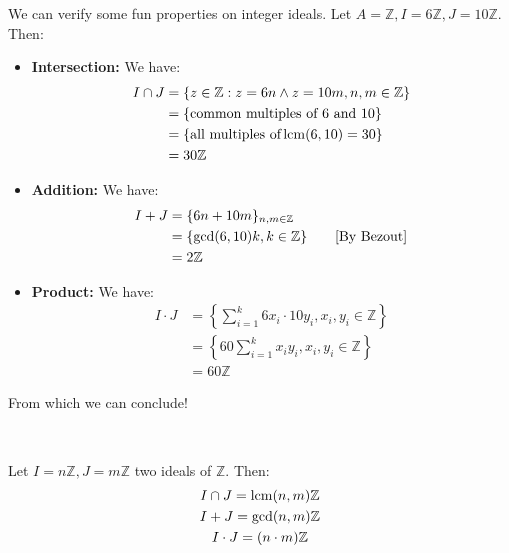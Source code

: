 We can verify some fun properties on integer ideals. Let $A = \mathbb{Z}, I = 6\mathbb{Z}, J = 10\mathbb{Z}$. Then: 
\begin{itemize}
  \item \textbf{Intersection:} We have: 
  \begin{align*}
    I \cap J 
    &= \{z \in \mathbb{Z}: z = 6n \land z = 10m, n, m \in \mathbb{Z}\} \\
    &= \{\text{common multiples of 6 and 10}\} \\
    &= \{\text{all multiples of} \operatorname{lcm}(6, 10) = 30\} \\
    &= 30\mathbb{Z}
  \end{align*}
  \item \textbf{Addition:} We have: 
  \begin{align*}
    I + J 
    &= \{6n + 10m\}_{n, m \in \mathbb{Z}} \\
    &= \{\gcd(6, 10)k, k \in \mathbb{Z}\} \tag*{\text{[By Bezout]}} \\
    &= 2\mathbb{Z}
  \end{align*}
  \item \textbf{Product:} We have: 
  \begin{align*}
    I \cdot J 
    &= \left\{\sum_{i = 1}^k 6x_i \cdot 10y_i, x_i, y_i \in \mathbb{Z}\right\} \\
    &= \left\{ 60\sum_{i = 1}^k x_iy_i,  x_i, y_i \in \mathbb{Z} \right\} \\
    &= 60\mathbb{Z}
  \end{align*}
\end{itemize}

From which we can conclude!

\ 

\begin{theorem}\label{idealops}
  Let $I = n\mathbb{Z}, J = m\mathbb{Z}$ two ideals of $\mathbb{Z}$. Then: 
  \begin{gather*}
    I \cap J = \operatorname{lcm}(n, m)\mathbb{Z} \\
    I + J = \gcd(n, m)\mathbb{Z} \\
    I \cdot J = (n \cdot m)\mathbb{Z}
  \end{gather*}
\end{theorem}

